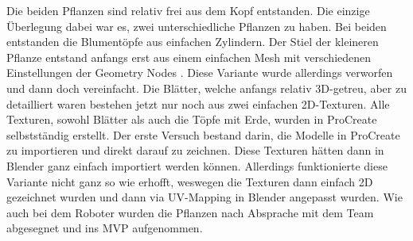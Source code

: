 Die beiden Pflanzen sind relativ frei aus dem Kopf entstanden. Die einzige Überlegung dabei war es, zwei unterschiedliche Pflanzen zu haben. Bei beiden entstanden die Blumentöpfe aus einfachen Zylindern. Der Stiel der kleineren Pflanze entstand anfangs erst aus einem einfachen Mesh mit verschiedenen Einstellungen der Geometry Nodes \cite{Geometry_Node_Tutorial}. Diese Variante wurde allerdings verworfen und dann doch vereinfacht. Die Blätter, welche anfangs relativ 3D-getreu, aber zu detailliert waren bestehen jetzt nur noch aus zwei einfachen 2D-Texturen. Alle Texturen, sowohl Blätter als auch die Töpfe mit Erde, wurden in ProCreate selbstständig erstellt. Der erste Versuch bestand darin, die Modelle in ProCreate zu importieren und direkt darauf zu zeichnen. Diese Texturen hätten dann in Blender ganz einfach importiert werden können. Allerdings funktionierte diese Variante nicht ganz so wie erhofft, weswegen die Texturen dann einfach 2D gezeichnet wurden und dann via UV-Mapping in Blender angepasst wurden. Wie auch bei dem Roboter wurden die Pflanzen nach Absprache mit dem Team abgesegnet und ins MVP aufgenommen.
